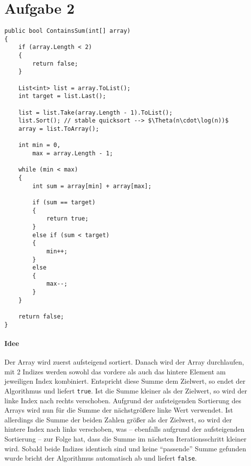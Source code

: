\section*{Aufgabe 2}
\begin{minipage}[t]{0.5\textwidth}
\begin{verbatim}
public bool ContainsSum(int[] array)
{
	if (array.Length < 2)
    {
        return false;
    }
    
	List<int> list = array.ToList();
    int target = list.Last();
    
    list = list.Take(array.Length - 1).ToList();
    list.Sort(); // stable quicksort --> $\Theta(n\cdot\log(n))$
    array = list.ToArray();
    
    int min = 0,
    	max = array.Length - 1;
    
    while (min < max)
    {
    	int sum = array[min] + array[max];
        
    	if (sum == target)
        {
      		return true;
        }
        else if (sum < target)
        {
        	min++;
        }
        else
        {
        	max--;
        }
    }
    
    return false;
}
\end{verbatim}
\end{minipage}
\hfill
\begin{minipage}[t]{0.375\textwidth}
	\paragraph*{Idee} Der Array wird zuerst aufsteigend sortiert. Danach wird der Array durchlaufen, mit 2 Indizes werden sowohl das vordere als auch das hintere Element am jeweiligen Index kombiniert. Entspricht diese Summe dem Zielwert, so endet der Algorithmus und liefert \texttt{true}. Ist die Summe kleiner als der Zielwert, so wird der linke Index nach rechts verschoben. Aufgrund der aufsteigenden Sortierung des Arrays wird nun für die Summe der nächstgrößere linke Wert verwendet. Ist allerdings die Summe der beiden Zahlen größer als der Zielwert, so wird der hintere Index nach links verschoben, was -- ebenfalls aufgrund der aufsteigenden Sortierung -- zur Folge hat, dass die Summe im nächsten Iterationsschritt kleiner wird. Sobald beide Indizes identisch sind und keine \enquote{passende} Summe gefunden wurde bricht der Algorithmus automatisch ab und liefert \texttt{false}.
\end{minipage} \\[1cm]

